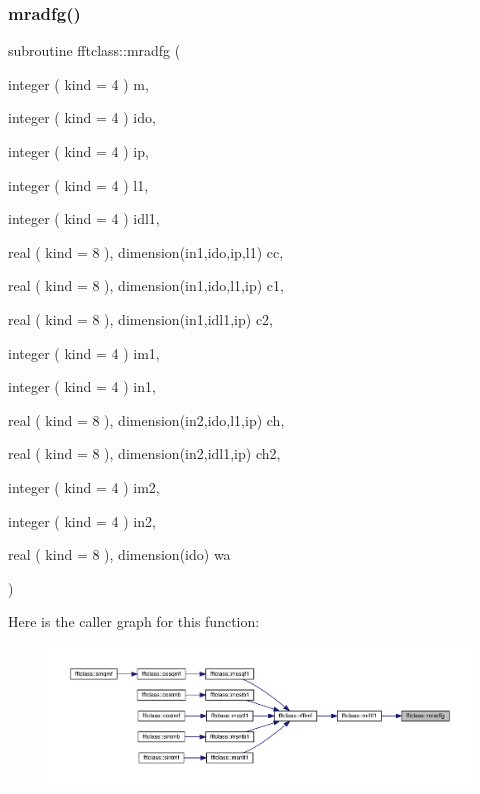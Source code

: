 \subsubsection{\texorpdfstring{mradfg()}{mradfg()}}
{\footnotesize\ttfamily subroutine fftclass\+::mradfg (\begin{DoxyParamCaption}\item[{integer ( kind = 4 )}]{m,  }\item[{integer ( kind = 4 )}]{ido,  }\item[{integer ( kind = 4 )}]{ip,  }\item[{integer ( kind = 4 )}]{l1,  }\item[{integer ( kind = 4 )}]{idl1,  }\item[{real ( kind = 8 ), dimension(in1,ido,ip,l1)}]{cc,  }\item[{real ( kind = 8 ), dimension(in1,ido,l1,ip)}]{c1,  }\item[{real ( kind = 8 ), dimension(in1,idl1,ip)}]{c2,  }\item[{integer ( kind = 4 )}]{im1,  }\item[{integer ( kind = 4 )}]{in1,  }\item[{real ( kind = 8 ), dimension(in2,ido,l1,ip)}]{ch,  }\item[{real ( kind = 8 ), dimension(in2,idl1,ip)}]{ch2,  }\item[{integer ( kind = 4 )}]{im2,  }\item[{integer ( kind = 4 )}]{in2,  }\item[{real ( kind = 8 ), dimension(ido)}]{wa }\end{DoxyParamCaption})}

Here is the caller graph for this function\+:\nopagebreak
\begin{figure}[H]
\begin{center}
\leavevmode
\includegraphics[width=350pt]{namespacefftclass_a5741ec7db9519828a0c46df4355b734d_icgraph}
\end{center}
\end{figure}
\mbox{\label{namespacefftclass_a025f68a6ddd573ad3fa337835b621d3c}} 

